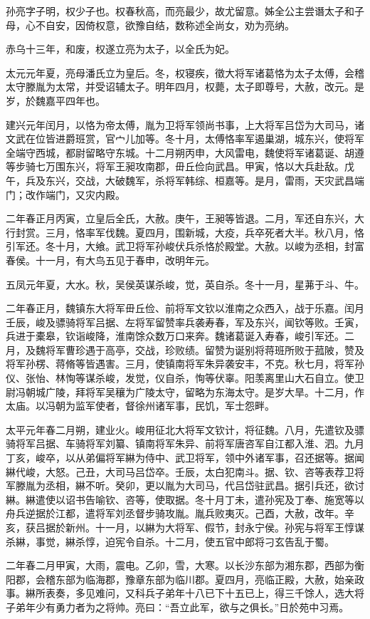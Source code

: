 \documentclass[12pt,UTF8]{ctexbook}
\begin{document}
孙亮字子明，权少子也。权春秋高，而亮最少，故尤留意。姊全公主尝谮太子和子母，心不自安，因倚权意，欲豫自结，数称述全尚女，劝为亮纳。

赤乌十三年，和废，权遂立亮为太子，以全氏为妃。

太元元年夏，亮母潘氏立为皇后。冬，权寝疾，徵大将军诸葛恪为太子太傅，会稽太守滕胤为太常，并受诏辅太子。明年四月，权薨，太子即尊号，大赦，改元。是岁，於魏嘉平四年也。

建兴元年闰月，以恪为帝太傅，胤为卫将军领尚书事，上大将军吕岱为大司马，诸文武在位皆进爵班赏，官{宀儿}加等。冬十月，太傅恪率军遏巢湖，城东兴，使将军全端守西城，都尉留略守东城。十二月朔丙申，大风雷电，魏使将军诸葛诞、胡遵等步骑七万围东兴，将军王昶攻南郡，毌丘俭向武昌。甲寅，恪以大兵赴敌。戊午，兵及东兴，交战，大破魏军，杀将军韩综、桓嘉等。是月，雷雨，天灾武昌端门；改作端门，又灾内殿。

二年春正月丙寅，立皇后全氏，大赦。庚午，王昶等皆退。二月，军还自东兴，大行封赏。三月，恪率军伐魏。夏四月，围新城，大疫，兵卒死者大半。秋八月，恪引军还。冬十月，大飨。武卫将军孙峻伏兵杀恪於殿堂。大赦。以峻为丞相，封富春侯。十一月，有大鸟五见于春申，改明年元。

五凤元年夏，大水。秋，吴侯英谋杀峻，觉，英自杀。冬十一月，星茀于斗、牛。

二年春正月，魏镇东大将军毌丘俭、前将军文钦以淮南之众西入，战于乐嘉。闰月壬辰，峻及骠骑将军吕据、左将军留赞率兵袭寿春，军及东兴，闻钦等败。壬寅，兵进于橐皋，钦诣峻降，淮南馀众数万口来奔。魏诸葛诞入寿春，峻引军还。二月，及魏将军曹珍遇于高亭，交战，珍败绩。留赞为诞别将蒋班所败于菰陂，赞及将军孙楞、蒋脩等皆遇害。三月，使镇南将军朱异袭安丰，不克。秋七月，将军孙仪、张怡、林恂等谋杀峻，发觉，仪自杀，恂等伏辜。阳羡离里山大石自立。使卫尉冯朝城广陵，拜将军吴穰为广陵太守，留略为东海太守。是岁大旱。十二月，作太庙。以冯朝为监军使者，督徐州诸军事，民饥，军士怨畔。

太平元年春二月朔，建业火。峻用征北大将军文钦计，将征魏。八月，先遣钦及骠骑将军吕据、车骑将军刘纂、镇南将军朱异、前将军唐咨军自江都入淮、泗。九月丁亥，峻卒，以从弟偏将军綝为侍中、武卫将军，领中外诸军事，召还据等。据闻綝代峻，大怒。己丑，大司马吕岱卒。壬辰，太白犯南斗。据、钦、咨等表荐卫将军滕胤为丞相，綝不听。癸卯，更以胤为大司马，代吕岱驻武昌。据引兵还，欲讨綝。綝遣使以诏书告喻钦、咨等，使取据。冬十月丁未，遣孙宪及丁奉、施宽等以舟兵逆据於江都，遣将军刘丞督步骑攻胤。胤兵败夷灭。己酉，大赦，改年。辛亥，获吕据於新州。十一月，以綝为大将军、假节，封永宁侯。孙宪与将军王惇谋杀綝，事觉，綝杀惇，迫宪令自杀。十二月，使五官中郎将刁玄告乱于蜀。

二年春二月甲寅，大雨，震电。乙卯，雪，大寒。以长沙东部为湘东郡，西部为衡阳郡，会稽东部为临海郡，豫章东部为临川郡。夏四月，亮临正殿，大赦，始亲政事。綝所表奏，多见难问，又科兵子弟年十八已下十五已上，得三千馀人，选大将子弟年少有勇力者为之将帅。亮曰：“吾立此军，欲与之俱长。”日於苑中习焉。
\end{document}
